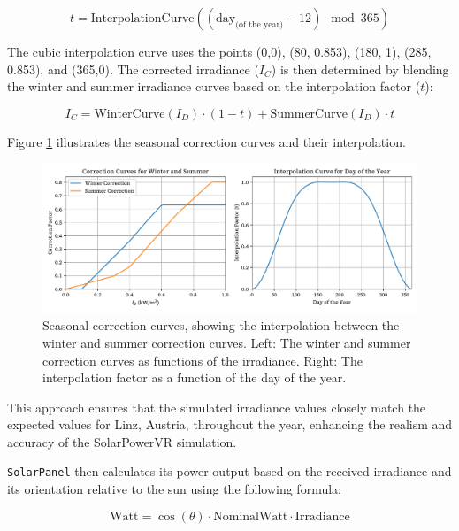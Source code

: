 \documentclass[draft, final]{vutinfth} %
\begin{document}
\begin{equation} \label{eq:interpolation_factor}
t = \text{InterpolationCurve}\left(\left(\text{day}_{\text{(of the year)}} - 12\right) \mod 365\right)
\end{equation}

The cubic interpolation curve uses the points (0,0), (80, 0.853), (180, 1), (285, 0.853), and (365,0). The corrected irradiance ($I_C$) is then determined by blending the winter and summer irradiance curves based on the interpolation factor ($t$):

\begin{equation} \label{eq:seasonal_irradiance}
I_C = \text{WinterCurve}(I_D) \cdot (1 - t) + \text{SummerCurve}(I_D) \cdot t
\end{equation}

Figure \ref{fig:seasonal_correction_curves} illustrates the seasonal correction curves and their interpolation.

\begin{figure}[h]
    \centering
    \includegraphics[width=\textwidth]{graphics/correction.pdf}
    \caption{Seasonal correction curves, showing the interpolation between the winter and summer correction curves. Left: The winter and summer correction curves as functions of the irradiance. Right: The interpolation factor as a function of the day of the year.}
    \label{fig:seasonal_correction_curves}
\end{figure}

This approach ensures that the simulated irradiance values closely match the expected values for Linz, Austria, throughout the year, enhancing the realism and accuracy of the SolarPowerVR simulation.

\lstinline|SolarPanel| then calculates its power output based on the received irradiance and its orientation relative to the sun using the following formula:

\begin{equation}
    \text{Watt} = \cos(\theta) \cdot \text{NominalWatt} \cdot \text{Irradiance}
\end{equation}
\end{document}
